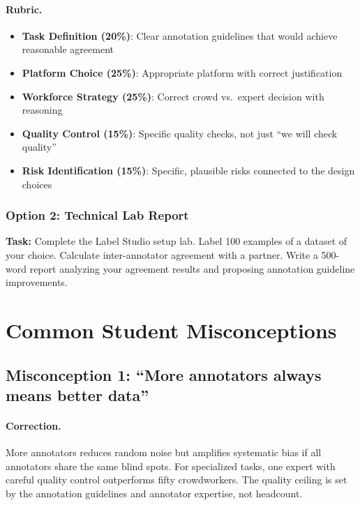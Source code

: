 \paragraph{Rubric.}
\begin{itemize}
    \item \textbf{Task Definition (20\%)}: Clear annotation guidelines that would achieve reasonable agreement
    \item \textbf{Platform Choice (25\%)}: Appropriate platform with correct justification
    \item \textbf{Workforce Strategy (25\%)}: Correct crowd vs.\ expert decision with reasoning
    \item \textbf{Quality Control (15\%)}: Specific quality checks, not just ``we will check quality''
    \item \textbf{Risk Identification (15\%)}: Specific, plausible risks connected to the design choices
\end{itemize}

\subsubsection{Option 2: Technical Lab Report}

\textbf{Task:} Complete the Label Studio setup lab. Label 100 examples of a dataset of your choice. Calculate inter-annotator agreement with a partner. Write a 500-word report analyzing your agreement results and proposing annotation guideline improvements.

\section{Common Student Misconceptions}

\subsection{Misconception 1: ``More annotators always means better data''}

\paragraph{Correction.}
More annotators reduces random noise but amplifies systematic bias if all annotators share the same blind spots. For specialized tasks, one expert with careful quality control outperforms fifty crowdworkers. The quality ceiling is set by the annotation guidelines and annotator expertise, not headcount.

